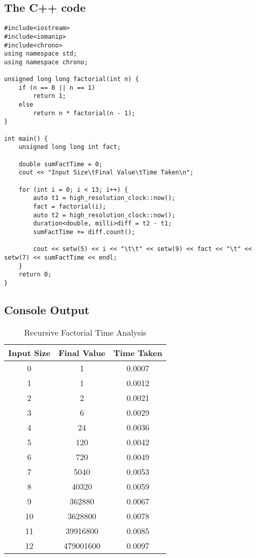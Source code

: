 \documentclass[a4paper, 12pt]{article}
\begin{document}
	\subsection*{The C++ code}
	\begin{lstlisting}
#include<iostream>
#include<iomanip>
#include<chrono>
using namespace std;
using namespace chrono;

unsigned long long factorial(int n) {
	if (n == 0 || n == 1)
		return 1;
	else
		return n * factorial(n - 1);
}

int main() {
	unsigned long long int fact;

	double sumFactTime = 0;
	cout << "Input Size\tFinal Value\tTime Taken\n";

	for (int i = 0; i < 13; i++) {
		auto t1 = high_resolution_clock::now();
		fact = factorial(i);
		auto t2 = high_resolution_clock::now();
		duration<double, milli>diff = t2 - t1;
		sumFactTime += diff.count();

		cout << setw(5) << i << "\t\t" << setw(9) << fact << "\t" << setw(7) << sumFactTime << endl;
	}
	return 0;
}
	\end{lstlisting}
	
	\subsection*{Console Output}
\begin{table}[H]
	\begin{center}
		\begin{tabular}{|c|c|c|}
		\hline
		Input Size  &    Final Value  &   Time Taken\\\hline
    0  &                 1 &       0.0007\\
    1  &                 1 &       0.0012\\
    2  &                 2  &      0.0021\\
    3   &                6  &      0.0029\\
    4   &               24  &      0.0036\\
    5   &              120  &      0.0042\\
    6   &              720  &      0.0049\\
    7   &             5040  &      0.0053\\
    8   &            40320   &     0.0059\\
    9   &           362880   &     0.0067\\
   10   &          3628800  &      0.0078\\
   11   &         39916800  &      0.0085\\
   12   &        479001600  &      0.0097	\\\hline
		\end{tabular}\caption{Recursive Factorial Time Analysis}\label{Table 4}
	\end{center}
\end{table}
\end{document}
